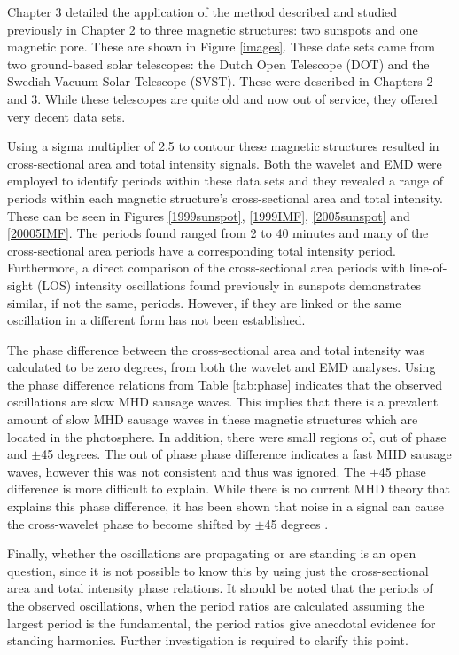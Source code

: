     Chapter 3 detailed the application of the method described and studied previously in Chapter 2 to three magnetic structures: two sunspots and one magnetic pore.
    These are shown in Figure \ref{images}.
    These date sets came from two ground-based solar telescopes: the Dutch Open Telescope (DOT) and the Swedish Vacuum Solar Telescope (SVST). 
    These were described in Chapters 2 and 3.
    While these telescopes are quite old and now out of service, they offered very decent data sets.
    
    Using a sigma multiplier of 2.5 to contour these magnetic structures
    resulted in cross-sectional area and total intensity signals.
    Both the wavelet and EMD were employed to identify periods within these data sets and they revealed a range of periods within each magnetic structure's cross-sectional area and total intensity.
    These can be seen in Figures \ref{1999sunspot}, \ref{1999IMF}, \ref{2005sunspot} and \ref{20005IMF}.
    The periods found ranged from 2 to 40 minutes and many of the cross-sectional area periods have a corresponding total intensity period.
    Furthermore, a direct comparison of the cross-sectional area periods with line-of-sight (LOS) intensity oscillations found previously in sunspots demonstrates similar, if not the same, periods.
    However, if they are linked or the same oscillation in a different form has not been established.
   
    The phase difference between the cross-sectional area and total intensity was calculated to be zero degrees, from both the wavelet and EMD analyses.
    Using the phase difference relations from Table \ref{tab:phase} indicates that the observed oscillations are slow MHD sausage waves. 
    This implies that there is a prevalent amount of slow MHD sausage waves in these magnetic structures which are located in the photosphere.
    In addition, there were small regions of, out of phase and $\pm$45 degrees.
    The out of phase phase difference indicates a fast MHD sausage waves, however this was not consistent and thus was ignored. 
    The $\pm$45 phase difference is more difficult to explain.
    While there is no current MHD theory that explains this phase difference, it has been shown that noise in a signal can cause the cross-wavelet phase to become shifted by $\pm$45 degrees \citep{2015A&A...579A..73M}.  
    
    Finally, whether the oscillations are propagating or are standing is an open question, since it is not possible to know this by using just the cross-sectional area and total intensity phase relations.    
    It should be noted that the periods of the observed oscillations, when the period ratios are calculated assuming the largest period is the fundamental, the period ratios give anecdotal evidence for standing harmonics.
    Further investigation is required to clarify this point.
    
